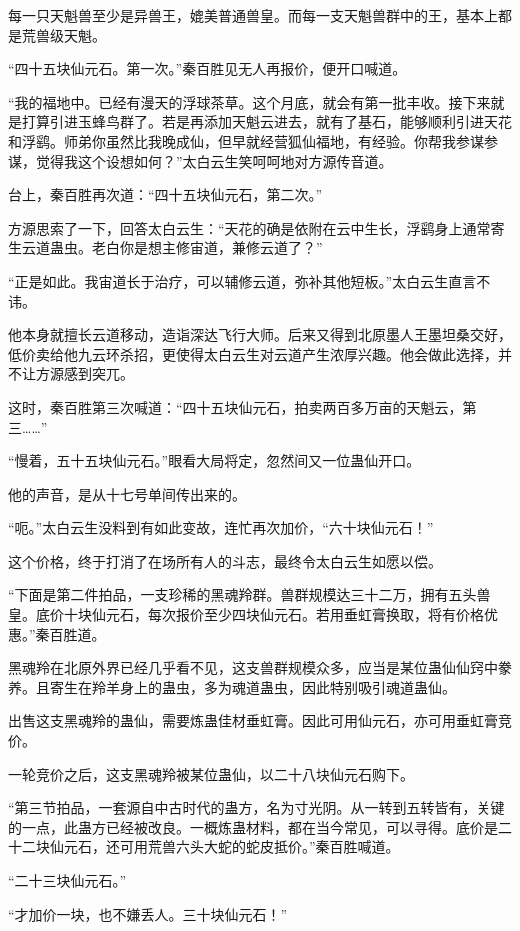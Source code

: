 \begin{this_body}
每一只天魁兽至少是异兽王，媲美普通兽皇。而每一支天魁兽群中的王，基本上都是荒兽级天魁。

“四十五块仙元石。第一次。”秦百胜见无人再报价，便开口喊道。

“我的福地中。已经有漫天的浮球茶草。这个月底，就会有第一批丰收。接下来就是打算引进玉蜂鸟群了。若是再添加天魁云进去，就有了基石，能够顺利引进天花和浮鹞。师弟你虽然比我晚成仙，但早就经营狐仙福地，有经验。你帮我参谋参谋，觉得我这个设想如何？”太白云生笑呵呵地对方源传音道。

台上，秦百胜再次道：“四十五块仙元石，第二次。”

方源思索了一下，回答太白云生：“天花的确是依附在云中生长，浮鹞身上通常寄生云道蛊虫。老白你是想主修宙道，兼修云道了？”

“正是如此。我宙道长于治疗，可以辅修云道，弥补其他短板。”太白云生直言不讳。

他本身就擅长云道移动，造诣深达飞行大师。后来又得到北原墨人王墨坦桑交好，低价卖给他九云环杀招，更使得太白云生对云道产生浓厚兴趣。他会做此选择，并不让方源感到突兀。

这时，秦百胜第三次喊道：“四十五块仙元石，拍卖两百多万亩的天魁云，第三……”

“慢着，五十五块仙元石。”眼看大局将定，忽然间又一位蛊仙开口。

他的声音，是从十七号单间传出来的。

“呃。”太白云生没料到有如此变故，连忙再次加价，“六十块仙元石！”

这个价格，终于打消了在场所有人的斗志，最终令太白云生如愿以偿。

“下面是第二件拍品，一支珍稀的黑魂羚群。兽群规模达三十二万，拥有五头兽皇。底价十块仙元石，每次报价至少四块仙元石。若用垂虹膏换取，将有价格优惠。”秦百胜道。

黑魂羚在北原外界已经几乎看不见，这支兽群规模众多，应当是某位蛊仙仙窍中豢养。且寄生在羚羊身上的蛊虫，多为魂道蛊虫，因此特别吸引魂道蛊仙。

出售这支黑魂羚的蛊仙，需要炼蛊佳材垂虹膏。因此可用仙元石，亦可用垂虹膏竞价。

一轮竞价之后，这支黑魂羚被某位蛊仙，以二十八块仙元石购下。

“第三节拍品，一套源自中古时代的蛊方，名为寸光阴。从一转到五转皆有，关键的一点，此蛊方已经被改良。一概炼蛊材料，都在当今常见，可以寻得。底价是二十二块仙元石，还可用荒兽六头大蛇的蛇皮抵价。”秦百胜喊道。

“二十三块仙元石。”

“才加价一块，也不嫌丢人。三十块仙元石！”


\end{this_body}
